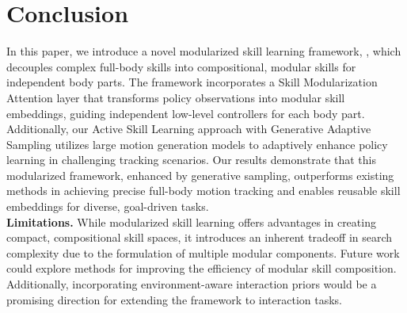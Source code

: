 \section{Conclusion}
\label{sec:conclusion}

In this paper, we introduce a novel modularized skill learning framework, \name, which decouples complex full-body skills into compositional, modular skills for independent body parts. The framework incorporates a Skill Modularization Attention layer that transforms policy observations into modular skill embeddings, guiding independent low-level controllers for each body part. Additionally, our Active Skill Learning approach with Generative Adaptive Sampling utilizes large motion generation models to adaptively enhance policy learning in challenging tracking scenarios. Our results demonstrate that this modularized framework, enhanced by generative sampling, outperforms existing methods in achieving precise full-body motion tracking and enables reusable skill embeddings for diverse, goal-driven tasks.\\

\noindent \textbf{Limitations.} While modularized skill learning offers advantages in creating compact, compositional skill spaces, it introduces an inherent tradeoff in search complexity due to the formulation of multiple modular components. Future work could explore methods for improving the efficiency of modular skill composition. Additionally, incorporating environment-aware interaction priors would be a promising direction for extending the framework to interaction tasks.

